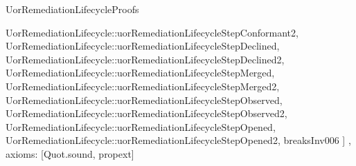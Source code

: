 \begin{lexlean}{UorRemediationLifecycleProofs}
\begin{semanticmodule}
{{      UorRemediationLifecycle::uorRemediationLifecycleStepConformant2,
      UorRemediationLifecycle::uorRemediationLifecycleStepDeclined,
      UorRemediationLifecycle::uorRemediationLifecycleStepDeclined2,
      UorRemediationLifecycle::uorRemediationLifecycleStepMerged,
      UorRemediationLifecycle::uorRemediationLifecycleStepMerged2,
      UorRemediationLifecycle::uorRemediationLifecycleStepObserved,
      UorRemediationLifecycle::uorRemediationLifecycleStepObserved2,
      UorRemediationLifecycle::uorRemediationLifecycleStepOpened,
      UorRemediationLifecycle::uorRemediationLifecycleStepOpened2,
      breaksInv006
    ]
  },
  axioms: [Quot.sound, propext]
}
\end{semanticmodule}
\end{lexlean}
